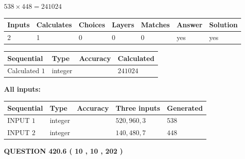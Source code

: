 \documentclass{ctexart}
\begin{document}
 

$ %
538 \times  %
448=   %
241024$
 
 
\noindent{}
 
 

 
   
   
   
   
\noindent\begin{tabular}{|l|l|l|l|l|l|l|}
 \hline
Inputs & Calculates & Choices & Layers & Matches & Answer & Solution \\ \hline
 2  & 
 1  & 
 0
  & 
 0  & 
 0  & 
  yes & 
  yes 
  \\ \hline
 \end{tabular}
   
   
   
   
\noindent{}
   
   
  
  
\noindent\begin{tabular}{|l|l|l|l|}
\hline
 Sequential & Type & Accuracy & Calculated \\ 
\hline
 
 
  Calculated $  1 $ & integer &  & 
  $ 241024 $ 
 \\  \hline  
 \end{tabular}
   
   
   
   
\noindent\vspace{0.1in}\hspace{-0.08in} {\textbf{\Large{All inputs: }}}
   
   
  
  
\noindent\begin{tabular}{|l|l|l|l|l|}
\hline
 Sequential & Type & Accuracy & Three inputs & Generated \\ 
\hline
 
 
  INPUT $  1 $ & integer &  & $
 520
 , 
 960
 , 
 3
 $ & $ 538 $ 
 \\  \hline  
 
 
  INPUT $  2 $ & integer &  & $
 140
 , 
 480
 , 
 7
 $ & $ 448 $ 
 \\  \hline  
 \end{tabular}
   
   
  
\vspace{0.2in}
  
{\textbf{\Large{QUESTION
420.6 
 ( 10 , 10 , 202 )
}}}
  
\end{document}
